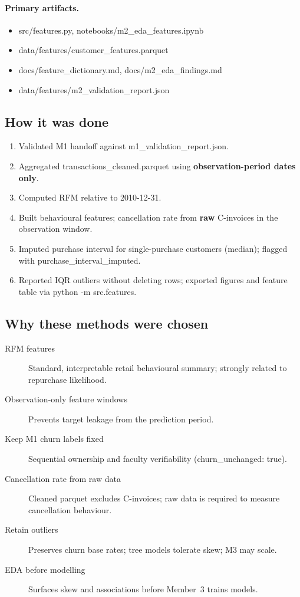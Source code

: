 \documentclass[11pt,a4paper]{article}
\renewcommand{\texttt}[1]{#1}
\begin{document}
\paragraph{Primary artifacts.}
\begin{itemize}
  \item \texttt{src/features.py}, \texttt{notebooks/m2\_eda\_features.ipynb}
  \item \texttt{data/features/customer\_features.parquet}
  \item \texttt{docs/feature\_dictionary.md}, \texttt{docs/m2\_eda\_findings.md}
  \item \texttt{data/features/m2\_validation\_report.json}
\end{itemize}

\subsection{How it was done}
\begin{enumerate}
  \item Validated M1 handoff against \texttt{m1\_validation\_report.json}.
  \item Aggregated \texttt{transactions\_cleaned.parquet} using
        \textbf{observation-period dates only}.
  \item Computed RFM relative to 2010-12-31.
  \item Built behavioural features; cancellation rate from \textbf{raw}
        \texttt{C}-invoices in the observation window.
  \item Imputed purchase interval for single-purchase customers (median);
        flagged with \texttt{purchase\_interval\_imputed}.
  \item Reported IQR outliers without deleting rows; exported figures and
        feature table via \texttt{python -m src.features}.
\end{enumerate}

\subsection{Why these methods were chosen}
\begin{description}
  \item[RFM features]
        Standard, interpretable retail behavioural summary; strongly related to
        repurchase likelihood.
  \item[Observation-only feature windows]
        Prevents target leakage from the prediction period.
  \item[Keep M1 churn labels fixed]
        Sequential ownership and faculty verifiability
        (\texttt{churn\_unchanged: true}).
  \item[Cancellation rate from raw data]
        Cleaned parquet excludes \texttt{C}-invoices; raw data is required to
        measure cancellation behaviour.
  \item[Retain outliers]
        Preserves churn base rates; tree models tolerate skew; M3 may scale.
  \item[EDA before modelling]
        Surfaces skew and associations before Member~3 trains models.
\end{description}
\end{document}
